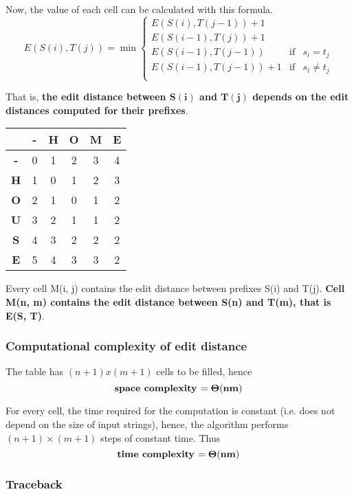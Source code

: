 \documentclass[12pt, letterpaper]{article}
\begin{document}
Now, the value of each cell can be calculated with this formula.
$$
E(S(i), T(j)) = \min \left\{\begin{array}{rcl}
E(S(i), T(j-1)) + 1 \\ 
E(S(i-1), T(j)) + 1 \\
E(S(i-1), T(j-1)) & \mbox{if} & s_i = t_j \\
E(S(i-1), T(j-1)) +1 & \mbox{if} & s_i \neq t_j \\
\end{array}
\right.
$$

That is, \textbf{the edit distance between $\mathbf{S(i)}$ and $\mathbf{T(j)}$ depends on the edit distances computed for their prefixes}.

\begin{center}
\begin{tabular}{|c|c|c|c|c|c|}
\hline
& \textbf{-} & \textbf{H} & \textbf{O} & \textbf{M} & \textbf{E} \\
\hline
\textbf{-} & 0 & 1 & 2 & 3 & 4 \\
\hline
\textbf{H} & 1 & 0 & 1 & 2 & 3 \\
\hline
\textbf{O} & 2 & 1 & 0 & 1 & 2 \\
\hline
\textbf{U} & 3 & 2 & 1 & 1 & 2 \\
\hline
\textbf{S} & 4 & 3 & 2 & 2 & 2 \\
\hline
\textbf{E} & 5 & 4 & 3 & 3 & \cellcolor[gray]{0.9}2 \\
\hline
\end{tabular}
\end{center}

Every cell M(i, j) contains the edit distance between prefixes S(i) and T(j). \textbf{Cell M(n, m) contains the edit distance between S(n) and T(m), that is E(S, T)}.

\subsubsection{Computational complexity of edit distance}

The table has $(n + 1) x (m + 1)$ cells to be filled, hence
$$
\mbox{\textbf{space complexity }} \mathbf{= \Theta(nm)}
$$

For every cell, the time required for the computation is constant (i.e. does not depend on the size of input strings), hence, the algorithm performs $(n+1)\times(m+1)$ steps of constant time. Thus
$$
\mbox{\textbf{time complexity }} \mathbf{= \Theta(nm)}
$$

\subsubsection{Traceback}
\end{document}
